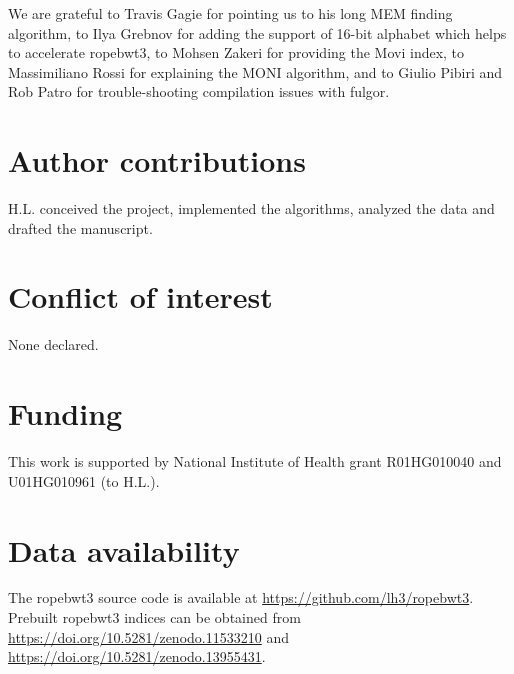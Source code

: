 \documentclass[webpdf,contemporary,large,namedate]{oup-authoring-template}%
\begin{document}
We are grateful to Travis Gagie for pointing us to his long MEM finding algorithm,
to Ilya Grebnov for adding the support of 16-bit alphabet which helps to accelerate ropebwt3,
to Mohsen Zakeri for providing the Movi index,
to Massimiliano Rossi for explaining the MONI algorithm,
and to Giulio Pibiri and Rob Patro for trouble-shooting compilation issues with fulgor.

\section*{Author contributions}

H.L. conceived the project, implemented the algorithms, analyzed the data and drafted the manuscript.

\section*{Conflict of interest}

None declared.

\section*{Funding}

This work is supported by National Institute of Health grant R01HG010040 and U01HG010961 (to H.L.).

\section*{Data availability}

The ropebwt3 source code is available at \url{https://github.com/lh3/ropebwt3}.
Prebuilt ropebwt3 indices can be obtained from \url{https://doi.org/10.5281/zenodo.11533210}
and \url{https://doi.org/10.5281/zenodo.13955431}.


{\sffamily\small
}
\end{document}
